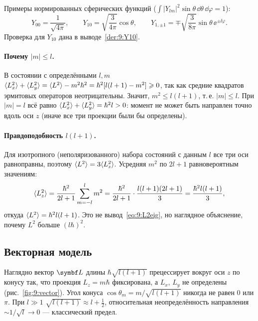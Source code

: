 Примеры нормированных сферических функций ($\int|Y_{lm}|^2\sin\theta\,\dd\theta\,\dd\varphi=1$):
\[
  Y_{00}=\frac{1}{\sqrt{4\pi}},\qquad
  Y_{10}=\sqrt{\frac{3}{4\pi}}\cos\theta,\qquad
  Y_{1,\pm1}=\mp\sqrt{\frac{3}{8\pi}}\sin\theta\,\ee^{\pm\ii\varphi}.
\]
Проверка для $Y_{10}$ дана в выводе~\ref{der:9:Y10}.

\paragraph{Почему $|m|\le l$.} В состоянии с определёнными $l,m$
$\langle L_x^2\rangle+\langle L_y^2\rangle=\langle L^2\rangle-m^2\hbar^2=\hbar^2[l(l+1)-m^2]\geqslant0$, так как средние квадратов
эрмитовых операторов неотрицательны. Значит, $m^2\le l(l+1)$, т.\,е. $|m|\le l$. При $|m|=l$ всё равно
$\langle L_x^2\rangle+\langle L_y^2\rangle=\hbar^2l>0$: момент не может быть направлен точно вдоль оси $z$
(иначе все три проекции были бы определены).

\paragraph{Правдоподобность $l(l+1)$.} Для изотропного (неполяризованного) набора состояний
с данным $l$ все три оси равноправны, поэтому $\langle L^2\rangle=3\langle L_z^2\rangle$. Усредняя $m^2$ по $2l+1$
равновероятным значениям:
\[
  \langle L_z^2\rangle=\frac{\hbar^2}{2l+1}\sum_{m=-l}^{l}m^2=\frac{\hbar^2}{2l+1}\cdot\frac{l(l+1)(2l+1)}{3}=\frac{\hbar^2l(l+1)}{3},
\]
откуда $\langle L^2\rangle=\hbar^2l(l+1)$. Это не вывод~\eqref{eq:9:L2eig}, но наглядное объяснение,
почему $L^2$ больше $(l\hbar)^2$.

\subsection{Векторная модель}

Наглядно вектор $\vect L$ длины $\hbar\sqrt{l(l+1)}$ прецессирует вокруг оси $z$ по конусу так, что
проекция $L_z=m\hbar$ фиксирована, а $L_x$, $L_y$ не определены (рис.~\ref{fig:9:vector}). Угол
конуса $\cos\theta_m=m/\sqrt{l(l+1)}$ никогда не равен 0 или $\pi$. При $l\gg1$
$\sqrt{l(l+1)}\approx l+\frac12$, относительная неопределённость направления $\sim1/\sqrt l\to0$ —
классический предел.

